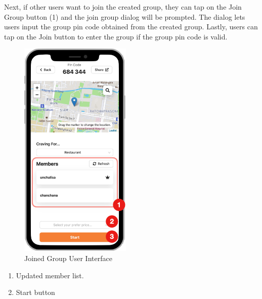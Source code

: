 \documentclass[12pt,oneside,openright,a4paper]{cpe-english-project}
\begin{document}
Next, if other users want to join the created group, they can tap on the Join Group button (1) and the join group dialog will be prompted. The dialog lets users input the group pin code obtained from the created group. Lastly, users can tap on the Join button to enter the group if the group pin code is valid.
\begin{figure}[H]\centering
\includegraphics[height=300pt]{./images/4ui_JoinedGroupUserInterface.png}
\caption{Joined Group User Interface}\label{fig:4ui_JoinedGroupUserInterface}
\end{figure}\vspace{-24pt}

\begin{enumerate}
\item Updated member list.
\item Start button
\end{enumerate}
\end{document}
